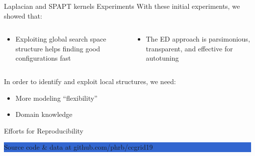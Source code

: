 \documentclass[10pt, compress, aspectratio=169, xcolor={table,usenames,dvipsnames}]{beamer}
\begin{document}
\begin{frame}[label={sec:org4ba545b}]{Laplacian and SPAPT kernels Experiments}
With these initial experiments, we showed that:

\begin{columns}
\begin{column}{0.5\columnwidth}
\begin{itemize}
\item Exploiting \alert{global search space structure} helps finding good configurations
fast
\end{itemize}
\end{column}
\begin{column}{0.5\columnwidth}
\begin{itemize}
\item The ED approach is parsimonious, transparent, and \alert{effective} for autotuning
\end{itemize}
\end{column}
\end{columns}
\vspace{0.5cm}
In order  to identify  and exploit \alert{local  structures}, we  need:

\begin{itemize}
\item More \alert{modeling ``flexibility''}
\item \alert{Domain knowledge}
\end{itemize}

\begin{block}{Efforts for Reproducibility}
\begin{center}
\colorbox{Highlight}{\parbox[c]{0.54\textwidth}{\centering \alert{Source code} \& \alert{data} at github.com/phrb/ccgrid19}}
\end{center}
\end{block}
\end{frame}
\end{document}
